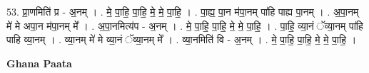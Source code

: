 \documentclass[17pt]{extarticle}
\begin{document}
53. प्रा॒णमिति॑ प्र - अ॒नम् । . मे॒ पा॒हि॒ पा॒हि॒ मे॒ मे॒ पा॒हि॒ । . पा॒ह्य॒ पा॒न म॑पा॒नम् पा॑हि पाह्य पा॒नम् । . अ॒पा॒नम् मे॑ मे अपा॒न म॑पा॒नम् मे᳚ । . अ॒पा॒नमित्य॑प - अ॒नम् । . मे॒ पा॒हि॒ पा॒हि॒ मे॒ मे॒ पा॒हि॒ । . पा॒हि॒ व्या॒नं ॅव्या॒नम् पा॑हि पाहि व्या॒नम् । . व्या॒नम् मे॑ मे व्या॒नं ॅव्या॒नम् मे᳚ । . व्या॒नमिति॑ वि - अ॒नम् । . मे॒ पा॒हि॒ पा॒हि॒ मे॒ मे॒ पा॒हि॒ । \newline

\textbf{Ghana Paata } \newline
\end{document}
